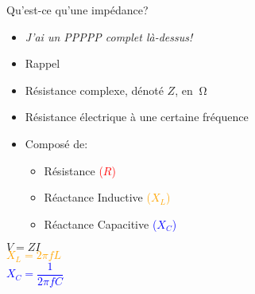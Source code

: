 \begin{frame}{Qu'est-ce qu'une impédance?}
    \begin{twocolumns}
        \leftcol
        \begin{itemize}
            \item \textit{J'ai un PPPPP complet là-dessus!}
            \item Rappel
            \bigskip
            \item Résistance complexe, dénoté $Z$, en $\SI{}{\ohm}$
            \item Résistance électrique à une certaine fréquence
            \item Composé de:
            \begin{itemize}
                \item Résistance \textcolor{red}{($R$)}
                \item Réactance Inductive \textcolor{orange}{($X_L$)}
                \item Réactance Capacitive \textcolor{blue}{($X_C$)}
            \end{itemize}
        \end{itemize}

        \rightcol
        \begin{center}
            \Large
            $V = ZI$\\
            \vspace{12pt}
            \textcolor{orange}{
                $X_L = 2\pi f L$\\
            }
            \vspace{12pt}
            \textcolor{blue}{
                $X_C = \dfrac{1}{2\pi f C}$
            }
        \end{center}
    \end{twocolumns}
\end{frame}

